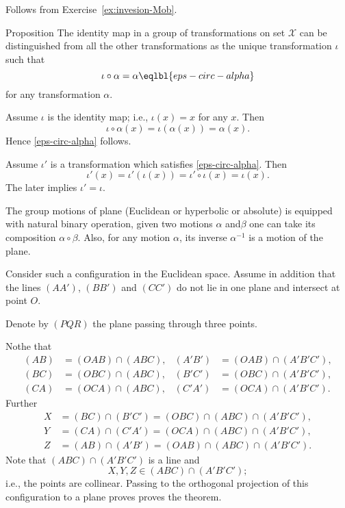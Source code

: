 Follows from
Exercise~\ref{ex:invesion-Mob}.













\begin{thm}{Proposition}
The identity map in a group of transformations on set $\mathcal X$ can be distinguished
from all the other transformations as the unique transformation $\iota$ such that
\[\iota\circ\alpha=\alpha
\eqlbl{eps-circ-alpha}\] 
for any transformation $\alpha$.
\end{thm}

Assume $\iota$ is the identity map;
i.e., $\iota(x)=x$ for any  $x$.
Then 
\[\iota\circ\alpha(x)=\iota(\alpha(x))=\alpha(x).\]
Hence \ref{eps-circ-alpha} follows.

Assume $\iota'$ is a transformation which satisfies \ref{eps-circ-alpha}.
Then 
\[\iota'(x)=\iota'(\iota(x))=\iota'\circ\iota(x)=\iota(x).\]
The later implies $\iota'=\iota$.
\qeds














The group motions of plane (Euclidean or hyperbolic or absolute) is equipped with natural binary operation, given two motions $\alpha$ and$\beta$ one can take its composition $\alpha\circ\beta$.
Also, for any motion $\alpha$,
its inverse $\alpha^{-1}$ is a motion of the plane.












Consider such a configuration in the Euclidean space.
Assume in addition that the lines $(AA')$, $(BB')$ and $(CC')$ do not lie in one plane and intersect at point $O$.

Denote by $(PQR)$ the plane passing through three points.

Nothe that
\begin{align*}
(AB)&= (OAB)\cap (ABC),&
(A'B')&= (OAB)\cap (A'B'C'),\\
(BC)&= (OBC)\cap (ABC),&
(B'C')&= (OBC)\cap (A'B'C'),\\
(CA)&= (OCA)\cap (ABC),&
(C'A')&= (OCA)\cap (A'B'C').
\end{align*}
Further
\begin{align*}
X&=(BC)\cap(B'C')=(OBC)\cap (ABC)\cap (A'B'C'),\\
Y&=(CA)\cap(C'A')=(OCA)\cap (ABC)\cap (A'B'C'),\\
Z&=(AB)\cap(A'B')=(OAB)\cap (ABC)\cap (A'B'C').
\end{align*}
Note that $(ABC)\cap (A'B'C')$ is a line and
\[X,Y,Z\in (ABC)\cap (A'B'C');\]
i.e., the points are collinear. 
Passing  to the orthogonal projection of this configuration to a plane proves proves the theorem.

